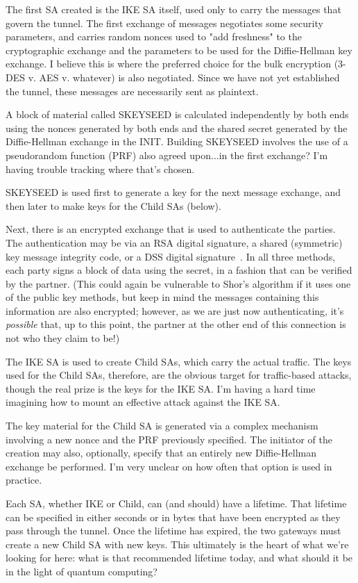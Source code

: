 The first SA created is the IKE SA itself, used only to carry the
messages that govern the tunnel.  The first exchange of messages
negotiates some security parameters, and carries random nonces used to
"add freshness" to the cryptographic exchange and the parameters to be
used for the Diffie-Hellman key exchange.  \ddp{} I believe this is where the
preferred choice for the bulk encryption (3-DES v. AES v. whatever) is
also negotiated.  Since we have not yet established the tunnel, these
messages are necessarily sent as plaintext.

A block of material called SKEYSEED is calculated independently by
both ends using the nonces generated by both ends and the
shared secret generated by the Diffie-Hellman exchange in the \ddp{} INIT.
Building SKEYSEED involves the use of a pseudorandom function (PRF)
also agreed upon...in the first exchange?  I'm having trouble tracking
where that's chosen.

SKEYSEED is used first to generate a key for the next message
exchange, and then later to make keys for the Child SAs (below).

Next, there is an encrypted exchange that is used to authenticate the
parties.  The authentication may be via an RSA digital signature, a
shared (symmetric) key message integrity code, or a DSS digital
signature~\cite{dss}.  In all three methods, each party signs a block of data
using the secret, in a fashion that can be verified by the partner.
(This could again be vulnerable to Shor's algorithm if it uses one of
the public key methods, but keep in mind the messages containing this
information are also encrypted; however, as we are just now
authenticating, it's \emph{possible} that, up to this point, the partner at
the other end of this connection is not who they claim to be!)  \ddp{} 

The IKE SA is used to create Child SAs, which carry the actual
traffic.  The keys used for the Child SAs, therefore, are the obvious
target for traffic-based attacks, though the real prize is the keys
for the IKE SA.  I'm having a hard time imagining how to mount an
effective attack against the IKE SA.  \ddp{} 

The key material for the Child SA is generated via a complex mechanism
involving a new nonce and the PRF previously specified.  The initiator
of the creation may also, optionally, specify that an entirely new
Diffie-Hellman exchange be performed.  I'm very unclear on how often
that option is used in practice.  \ddp{} 

Each SA, whether IKE or Child, can (and should) have a lifetime.  That
lifetime can be specified in either seconds or in bytes that have been
encrypted as they pass through the tunnel.  Once the lifetime has
expired, the two gateways must create a new Child SA with new keys.
This ultimately is the heart of what we're looking for here: what is
that recommended lifetime today, and what should it be in the light of
quantum computing?

